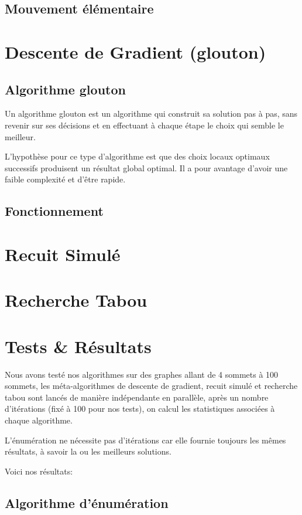 \documentclass[a4paper]{article}
\begin{document}
	\subsection{Mouvement élémentaire}

\section{Descente de Gradient (glouton)}
	\subsection{Algorithme glouton}
	Un algorithme glouton est un algorithme qui construit sa solution pas à pas, sans revenir sur ses décisions et en effectuant à chaque étape le choix qui semble le meilleur.

	L'hypothèse pour ce type d'algorithme est que des choix locaux optimaux successifs produisent un résultat global optimal. Il a pour avantage d'avoir une faible complexité et d'être rapide.

	\subsection{Fonctionnement}
	

\section{Recuit Simulé}

\section{Recherche Tabou}

\section{Tests \& Résultats}
Nous avons testé nos algorithmes sur des graphes allant de 4 sommets à 100 sommets, les méta-algorithmes de descente de gradient, recuit simulé et recherche tabou sont lancés de manière indépendante en parallèle, après un nombre d'itérations (fixé à 100 pour nos tests), on calcul les statistiques associées à chaque algorithme.

L'énumération ne nécessite pas d'itérations car elle fournie toujours les mêmes résultats, à savoir la ou les meilleurs solutions.

Voici nos résultats:

\subsection{Algorithme d'énumération}
\end{document}
